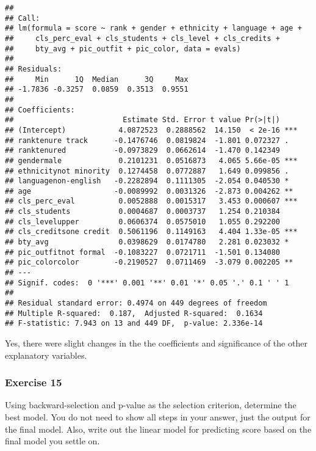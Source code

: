 \documentclass[
]{article}
\begin{document}
\begin{verbatim}
## 
## Call:
## lm(formula = score ~ rank + gender + ethnicity + language + age + 
##     cls_perc_eval + cls_students + cls_level + cls_credits + 
##     bty_avg + pic_outfit + pic_color, data = evals)
## 
## Residuals:
##     Min      1Q  Median      3Q     Max 
## -1.7836 -0.3257  0.0859  0.3513  0.9551 
## 
## Coefficients:
##                         Estimate Std. Error t value Pr(>|t|)    
## (Intercept)            4.0872523  0.2888562  14.150  < 2e-16 ***
## ranktenure track      -0.1476746  0.0819824  -1.801 0.072327 .  
## ranktenured           -0.0973829  0.0662614  -1.470 0.142349    
## gendermale             0.2101231  0.0516873   4.065 5.66e-05 ***
## ethnicitynot minority  0.1274458  0.0772887   1.649 0.099856 .  
## languagenon-english   -0.2282894  0.1111305  -2.054 0.040530 *  
## age                   -0.0089992  0.0031326  -2.873 0.004262 ** 
## cls_perc_eval          0.0052888  0.0015317   3.453 0.000607 ***
## cls_students           0.0004687  0.0003737   1.254 0.210384    
## cls_levelupper         0.0606374  0.0575010   1.055 0.292200    
## cls_creditsone credit  0.5061196  0.1149163   4.404 1.33e-05 ***
## bty_avg                0.0398629  0.0174780   2.281 0.023032 *  
## pic_outfitnot formal  -0.1083227  0.0721711  -1.501 0.134080    
## pic_colorcolor        -0.2190527  0.0711469  -3.079 0.002205 ** 
## ---
## Signif. codes:  0 '***' 0.001 '**' 0.01 '*' 0.05 '.' 0.1 ' ' 1
## 
## Residual standard error: 0.4974 on 449 degrees of freedom
## Multiple R-squared:  0.187,  Adjusted R-squared:  0.1634 
## F-statistic: 7.943 on 13 and 449 DF,  p-value: 2.336e-14
\end{verbatim}

Yes, there were slight changes in the the coefficients and significance
of the other explanatory variables.

\hypertarget{exercise-15}{%
\subsubsection{Exercise 15}\label{exercise-15}}

Using backward-selection and p-value as the selection criterion,
determine the best model. You do not need to show all steps in your
answer, just the output for the final model. Also, write out the linear
model for predicting score based on the final model you settle on.
\end{document}
